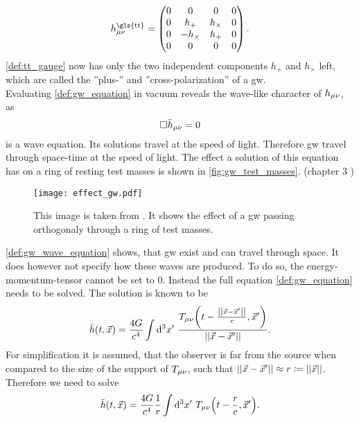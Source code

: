 \begin{equation}\label{def:tt_gauge}
h_\mn^\text{\gls{tt}}=
\begin{pmatrix}
	0 & 0         & 0        & 0\\
	0 & h_+       & h_\times & 0\\
	0 & -h_\times & h_+      & 0\\
	0 & 0         & 0        & 0\\
\end{pmatrix}.
\end{equation}
\eqref{def:tt_gauge} now has only the two independent components $h_+$ and $h_\times$ left, which are called the ''plus-'' and ''cross-polarization'' of a \gls{gw}.\medskip\\
Evaluating \eqref{def:gw_equation} in vacuum reveals the wave-like character of $h_{\mu\nu}$, as
\begin{equation}\label{def:gw_wave_equation}
\Box\bar{h}_{\mu\nu} =0
\end{equation}
is a wave equation. Its solutions travel at the speed of light. Therefore \gls{gw} travel through space-time at the speed of light. The effect a solution of this equation has on a ring of resting test masses is shown in \autoref{fig:gw_test_masses}. (chapter 3 \cite{bachelor})\medskip\\
\begin{figure}
\centering
\texttt{[image: effect\_gw.pdf]}
\caption[Effect of GW on ring of test masses]{This image is taken from \cite{bachelor}. It shows the effect of a \gls{gw} passing orthogonaly through a ring of test masses.}\label{fig:gw_test_masses}
\end{figure}
\eqref{def:gw_wave_equation} shows, that \gls{gw} exist and can travel through space. It does however not specify how these waves are produced. To do so, the energy-momentum-tensor cannot be set to $0$. Instead the full equation \eqref{def:gw_equation} needs to be solved. The solution is known to be
\begin{equation}
\bar{h}\lr{t, \vec{x}}=\frac{4 G}{c^4}\int\Diff{3}x'\ \frac{T_\mn\lr{t-\frac{\norm{\vec{x}-\vec{x}'}}{c},\vec{x}'}}{\norm{\vec{x}-\vec{x}'}}.
\end{equation}
For simplification it is assumed, that the observer is far from the source when compared to the size of the support of $T_{\mu\nu}$, such that ${\left|\left| \vec{x}-\vec{x}' \right|\right|}\approx r\coloneqq{\left|\left| \vec{x} \right|\right|}$. Therefore we need to solve
\begin{equation}
\bar{h}\lr{t, \vec{x}}=\frac{4 G}{c^4}\frac{1}{r}\int\Diff{3}x'\ T_\mn\lr{t-\frac{r}{c},\vec{x}'}.
\end{equation}
